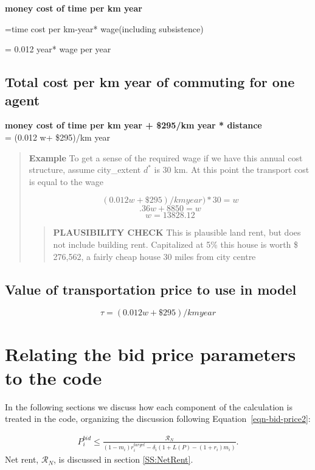 \textbf{money cost of time per km year} 

=time cost per km-year* wage(including subsistence) 

= 0.012 year* wage per year

\subsection{Total cost per km year of commuting for one agent}
\textbf{money cost of time per km year + \$295/km year * distance} \\
= (0.012 w+ \$295)/km year 
    \begin{quotation}
    \textbf{Example}
    To get a sense of the required wage if we have this annual cost structure, assume city\_extent $d^*$ is 30 km. At this point the transport cost is equal to the wage

\[(0.012 w+ \$295)/km year)*30 =  w\] 
\[.36w+ 8850=w\]
\[w=13828.12\]
        \begin{quotation}
        \textbf{PLAUSIBILITY CHECK}
This is plausible land rent, but does not include building rent. 
Capitalized at 5\% this house is worth \$ 276,562, a fairly cheap house 30 miles from city centre
        \end{quotation}
    \end{quotation}



\subsection{Value of transportation price to use in model}
\[ \tau=(0.012 w+ \$295)/km year \]



\section{Relating the bid price parameters to the code}


In the following sections we discuss %
how each component of the calculation is treated in the code, organizing the discussion following Equation~\ref{eqn-bid-price2}:


\begin{align}
P_i^{bid} \le   \frac{\mathcal{R}_N}{(1-m_i)r_i^{target}- \delta_i \left(1+L(P)- (1+ r_i)m_i\right)}.
\end{align}
Net rent, $\mathcal{R}_N$, is discussed in section \ref{SS:NetRent}. 

